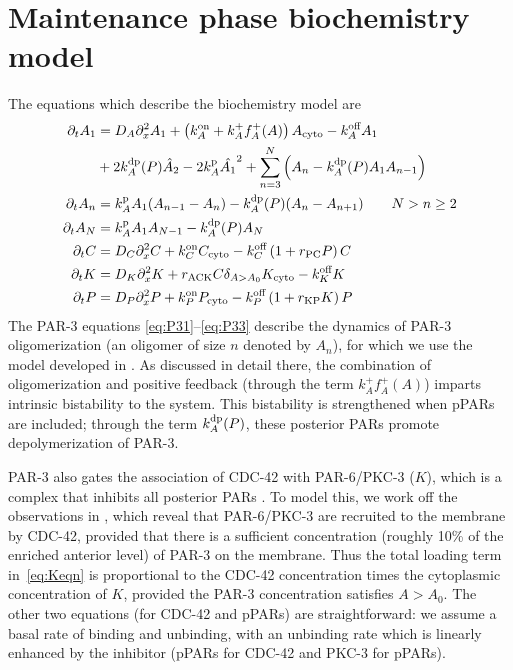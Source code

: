 \documentclass[11pt]{article}
\newcommand{\6}[1]{#1_{\text{6}}}
\newcommand{\3}[1]{#1_{\text{3}}}
\begin{document}
\section{Maintenance phase biochemistry model \label{sec:BCOnly}}
The equations which describe the biochemistry model are 
\begin{subequations}
\label{eq:AllBC}
\begin{align}
\label{eq:P31}
\partial_t A_1 & = D_A \partial_x^2 A_1 + \left(k^\text{on}_A+k^+_A f^+_A(A) \right)A_\text{cyto}- k^\text{off}_A A_1  \\  \nonumber
 &+ 2 k^\text{dp}_A(P) \hat{A}_2-2k^\text{p}_A \hat{A_1}^2+\sum_{n=3}^N \left(A_n-k^\text{dp}_A(P) A_1 A_{n-1}\right)  \\ 
\partial_t A_n & =k^\text{p}_{A}A_1 (A_{n-1}-A_n) -k^\text{dp}_A(P)(A_n-A_{n+1})  \qquad N > n \geq 2 \\ 
\label{eq:P33}
\partial_t A_N & =k^\text{p}_A A_1  A_{N-1}-k^\text{dp}_A(P) A_N \\
\label{eq:Ceqn}
\partial_t C& =D_C \partial_x^2 {C} +k^\text{on}_C C_\text{cyto}  - k^\text{off}_C \left(1+r_\text{PC}P\right)C\\
\label{eq:Keqn}
\partial_t {K}  &= D_K \partial_x^2 {K} + {r}_\text{ACK} {C} \delta_{A > A_0}K_\text{cyto}-k^\text{off}_K K \\
\partial_t {P} & =D_P \partial_x^2 {P} +k^\text{on}_P P_\text{cyto}  - k^\text{off}_P \left(1+{r}_\text{KP}{K}\right){P}
\end{align}
\end{subequations}
The PAR-3 equations \eqref{eq:P31}--\eqref{eq:P33} describe the dynamics of PAR-3 oligomerization  (an oligomer of size $n$ denoted by $A_n$), for which we use the model developed in \cite{lang2023oligomerization}. As discussed in detail there, the combination of oligomerization and positive feedback (through the term $k^+_A f^+_A(A)$) imparts intrinsic bistability to the system. This bistability is strengthened when pPARs are included; through the term $k^\text{dp}_A(P)$, these posterior PARs promote depolymerization of PAR-3.

PAR-3 also gates the association of CDC-42 with PAR-6/PKC-3 ($K$), which is a complex that inhibits all posterior PARs \cite{lang2017proteins}. To model this, we work off the observations in \cite{sailer2015dynamic}, which reveal that PAR-6/PKC-3 are recruited to the membrane by CDC-42, provided that there is a sufficient concentration (roughly 10\% of the enriched anterior level) of PAR-3 on the membrane. Thus the total loading term in\ \eqref{eq:Keqn} is proportional to the CDC-42 concentration times the cytoplasmic concentration of $K$, provided the PAR-3 concentration satisfies $A > A_0$. The other two equations (for CDC-42 and pPARs) are straightforward: we assume a basal rate of binding and unbinding, with an unbinding rate which is linearly enhanced by the inhibitor (pPARs for CDC-42 and PKC-3 for pPARs).
\end{document}

